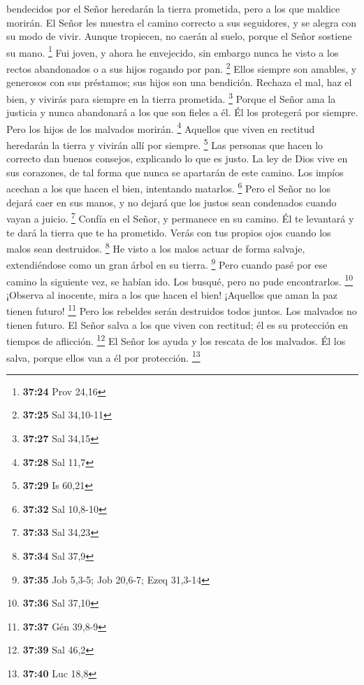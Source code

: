 bendecidos por el Señor heredarán la tierra prometida, pero a los que
maldice morirán.  El Señor les muestra el camino correcto a
sus seguidores, y se alegra con su modo de vivir.  Aunque
tropiecen, no caerán al suelo, porque el Señor sostiene su mano.
\footnote{\textbf{37:24} Prov 24,16}  Fui joven, y ahora he
envejecido, sin embargo nunca he visto a los rectos abandonados o a sus
hijos rogando por pan. \footnote{\textbf{37:25} Sal 34,10-11}
 Ellos siempre son amables, y generosos con sus préstamos;
sus hijos son una bendición.  Rechaza el mal, haz el bien,
y vivirás para siempre en la tierra prometida. \footnote{\textbf{37:27}
  Sal 34,15}  Porque el Señor ama la justicia y nunca
abandonará a los que son fieles a él. Él los protegerá por siempre. Pero
los hijos de los malvados morirán. \footnote{\textbf{37:28} Sal 11,7}
 Aquellos que viven en rectitud heredarán la tierra y
vivirán allí por siempre. \footnote{\textbf{37:29} Is 60,21}
 Las personas que hacen lo correcto dan buenos consejos,
explicando lo que es justo.  La ley de Dios vive en sus
corazones, de tal forma que nunca se apartarán de este camino.
 Los impíos acechan a los que hacen el bien, intentando
matarlos. \footnote{\textbf{37:32} Sal 10,8-10}  Pero el
Señor no los dejará caer en sus manos, y no dejará que los justos sean
condenados cuando vayan a juicio. \footnote{\textbf{37:33} Sal 34,23}
 Confía en el Señor, y permanece en su camino. Él te
levantará y te dará la tierra que te ha prometido. Verás con tus propios
ojos cuando los malos sean destruidos. \footnote{\textbf{37:34} Sal 37,9}
 He visto a los malos actuar de forma salvaje,
extendiéndose como un gran árbol en su tierra. \footnote{\textbf{37:35}
  Job 5,3-5; Job 20,6-7; Ezeq 31,3-14}  Pero cuando pasé
por ese camino la siguiente vez, se habían ido. Los busqué, pero no pude
encontrarlos. \footnote{\textbf{37:36} Sal 37,10}  ¡Observa
al inocente, mira a los que hacen el bien! ¡Aquellos que aman la paz
tienen futuro! \footnote{\textbf{37:37} Gén 39,8-9}  Pero
los rebeldes serán destruidos todos juntos. Los malvados no tienen
futuro.  El Señor salva a los que viven con rectitud; él es
su protección en tiempos de aflicción. \footnote{\textbf{37:39} Sal 46,2}
 El Señor los ayuda y los rescata de los malvados. Él los
salva, porque ellos van a él por protección. \footnote{\textbf{37:40}
  Luc 18,8}

